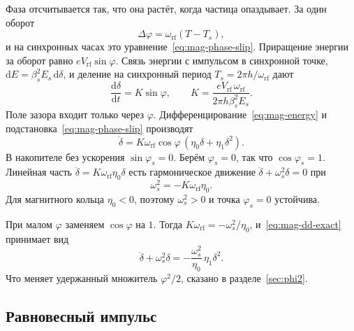Фаза отсчитывается так, что она растёт, когда частица опаздывает. За один оборот
\begin{equation}
\label{eq:mag-phase-map}
\Delta\varphi=\omega_{\mathrm{rf}}(T-T_s),
\end{equation}
и на синхронных часах это уравнение~\eqref{eq:mag-phase-slip}. Приращение энергии за оборот равно $eV_{\mathrm{rf}}\sin\varphi$. Связь энергии с импульсом в синхронной точке, $\mathrm{d}E=\beta_s^2 E_s\,\mathrm{d}\delta$, и деление на синхронный период $T_s=2\pi h/\omega_{\mathrm{rf}}$ дают
\begin{equation}
\label{eq:mag-energy}
\frac{\mathrm{d}\delta}{\mathrm{d}t}=K\sin\varphi,
\qquad
K=\frac{eV_{\mathrm{rf}}\,\omega_{\mathrm{rf}}}{2\pi h\beta_s^2 E_s}.
\end{equation}
Поле зазора входит только через $\varphi$. Дифференцирование~\eqref{eq:mag-energy} и подстановка~\eqref{eq:mag-phase-slip} производят
\begin{equation}
\label{eq:mag-dd-exact}
\ddot\delta
=K\omega_{\mathrm{rf}}\cos\varphi\,(\eta_0\delta+\eta_1\delta^2).
\end{equation}
В накопителе без ускорения $\sin\varphi_s=0$. Берём $\varphi_s=0$, так что $\cos\varphi_s=1$. Линейная часть $\ddot\delta=K\omega_{\mathrm{rf}}\eta_0\delta$ есть гармоническое движение $\ddot\delta+\omega_s^2\delta=0$ при
\begin{equation}
\label{eq:mag-ws2}
\omega_s^2=-K\omega_{\mathrm{rf}}\eta_0.
\end{equation}
Для магнитного кольца $\eta_0<0$, поэтому $\omega_s^2>0$ и точка $\varphi_s=0$ устойчива.

При малом $\varphi$ заменяем $\cos\varphi$ на $1$. Тогда $K\omega_{\mathrm{rf}}=-\omega_s^2/\eta_0$, и~\eqref{eq:mag-dd-exact} принимает вид
\begin{equation}
\label{eq:mag-osc}
\ddot\delta+\omega_s^2\delta
=-\frac{\omega_s^2}{\eta_0}\,\eta_1\delta^2.
\end{equation}
Что меняет удержанный множитель $\varphi^2/2$, сказано в разделе~\ref{sec:phi2}.

\subsection{Равновесный импульс}
\label{sec:equilibrium}

